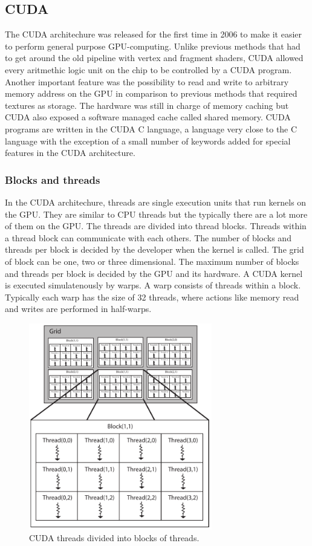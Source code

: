 \newpage
\subsection{CUDA}

The CUDA architechure was released for the first time in 2006 to make it easier to perform general purpose GPU-computing. Unlike previous methods that had to get around the old pipeline with vertex and fragment shaders, CUDA allowed every aritmethic logic unit on the chip to be controlled by a CUDA program. Another important feature was the possibility to read and write to arbitrary memory address on the GPU in comparison to previous methods that required textures as storage. The hardware was still in charge of memory caching but CUDA also exposed a software managed cache called shared memory. CUDA programs are written in the CUDA C language, a language very close to the C language with the exception of a small number of keywords added for special features in the CUDA architecture.  

\subsubsection{Blocks and threads}

In the CUDA architechure, threads are single execution units that run kernels on the GPU. They are similar to CPU threads but the typically there are a lot more of them on the GPU. The threads are divided into thread blocks. Threads within a thread block can communicate with each others. The number of blocks and threads per block is decided by the developer when the kernel is called. The grid of block can be one, two or three dimensional. The maximum number of blocks and threads per block is decided by the GPU and its hardware. A CUDA kernel is executed simulatenously by warps. A warp consists of threads within a block. Typically each warp has the size of 32 threads, where actions like memory read and writes are performed in half-warps. 
\newline

\begin{figure}[ht!]
\centering
\includegraphics[width=80mm]{img/cuda.pdf}
\caption{CUDA threads divided into blocks of threads.}
\label{cudablockthreads}
\end{figure}

